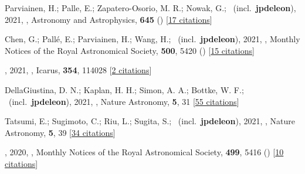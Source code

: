 \item[{\color{numcolor}\scriptsize138}] Parviainen, H.; Palle, E.; Zapatero-Osorio, M. R.; Nowak, G.; \etal\ (incl.\ \textbf{jpdeleon}), 2021, , Astronomy and Astrophysics, \textbf{645} () [\href{https://ui.adsabs.harvard.edu/abs/2021A&A...645A..16P}{17 citations}]

\item[{\color{numcolor}\scriptsize137}] Chen, G.; Pall{\'e}, E.; Parviainen, H.; Wang, H.; \etal\ (incl.\ \textbf{jpdeleon}), 2021, , Monthly Notices of the Royal Astronomical Society, \textbf{500}, 5420 () [\href{https://ui.adsabs.harvard.edu/abs/2021MNRAS.500.5420C}{15 citations}]

\item[{\color{numcolor}\scriptsize136}] , 2021, , Icarus, \textbf{354}, 114028 [\href{https://ui.adsabs.harvard.edu/abs/2021Icar..35414028A}{2 citations}]

\item[{\color{numcolor}\scriptsize135}] DellaGiustina, D. N.; Kaplan, H. H.; Simon, A. A.; Bottke, W. F.; \etal\ (incl.\ \textbf{jpdeleon}), 2021, , Nature Astronomy, \textbf{5}, 31 [\href{https://ui.adsabs.harvard.edu/abs/2021NatAs...5...31D}{55 citations}]

\item[{\color{numcolor}\scriptsize134}] Tatsumi, E.; Sugimoto, C.; Riu, L.; Sugita, S.; \etal\ (incl.\ \textbf{jpdeleon}), 2021, , Nature Astronomy, \textbf{5}, 39 [\href{https://ui.adsabs.harvard.edu/abs/2021NatAs...5...39T}{34 citations}]

\item[{\color{numcolor}\scriptsize133}] , 2020, , Monthly Notices of the Royal Astronomical Society, \textbf{499}, 5416 () [\href{https://ui.adsabs.harvard.edu/abs/2020MNRAS.499.5416C}{10 citations}]

